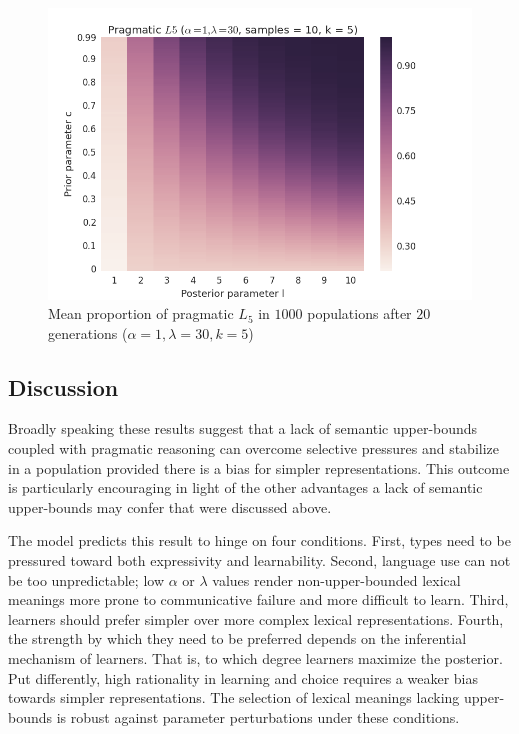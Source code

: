 \documentclass[a4paper]{article}
\begin{document}
\begin{figure}
\centering
\includegraphics[scale=.5]{../presentations/01heatmap}
\caption{Mean proportion of pragmatic $L_5$ in $1000$ populations after $20$ generations ($\alpha = 1, \lambda = 30, k = 5$)}
\label{fig:prior-posterior}
\end{figure}



\subsection{Discussion}
Broadly speaking these results suggest that a lack of semantic upper-bounds coupled with pragmatic reasoning can overcome selective pressures and stabilize in a population provided there is a bias for simpler representations. This outcome is particularly encouraging in light of the other advantages a lack of semantic upper-bounds may confer that were discussed above. 

The model predicts this result to hinge on four conditions. First, types need to be pressured toward both expressivity and learnability. Second, language use can not be too unpredictable; low $\alpha$ or $\lambda$ values render non-upper-bounded lexical meanings more prone to communicative failure and more difficult to learn. Third, learners should prefer simpler over more complex lexical representations. Fourth, the strength by which they need to be preferred depends on the inferential mechanism of learners. That is, to which degree learners maximize the posterior. Put differently, high rationality in learning and choice requires a weaker bias towards simpler representations. The selection of lexical meanings lacking upper-bounds is robust against parameter perturbations under these conditions.
\end{document}
